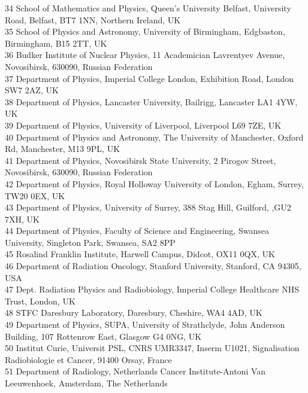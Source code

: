 {\begin{tabbing}
     34 \> School of Mathematics and Physics, Queen's University Belfast, University Road, Belfast, BT7 1NN, Northern Ireland, UK\\
     35 \> School of Physics and Astronomy, University of Birmingham, Edgbaston, Birmingham, B15 2TT, UK\\
     36 \> Budker Institute of Nuclear Physics, 11 Academician Lavrentyev Avenue, Novosibirsk, 630090, Russian Federation\\
     37 \> Department of Physics, Imperial College London, Exhibition Road, London SW7 2AZ, UK\\
     38 \> Department of Physics, Lancaster University, Bailrigg, Lancaster LA1 4YW, UK\\
     39 \> Department of Physics, University of Liverpool, Liverpool L69 7ZE, UK\\
     40 \> Department of Physics and Astronomy, The University of Manchester, Oxford Rd, Manchester, M13 9PL, UK\\
     41 \> Department of Physics, Novosibirsk State University, 2 Pirogov Street, Novosibirsk, 630090, Russian Federation\\
     42 \> Department of Physics, Royal Holloway University of London, Egham, Surrey, TW20 0EX, UK\\
     43 \> Department of Physics, University of Surrey, 388 Stag Hill, Guilford, ,GU2 7XH, UK\\
     44 \> Department of Physics, Faculty of Science and Engineering, Swansea University, Singleton Park, Swansea, SA2 8PP\\
     45 \> Rosalind Franklin Institute, Harwell Campus, Didcot, OX11 0QX, UK\\
     46 \> Department of Radiation Oncology, Stanford University, Stanford, CA 94305, USA\\
     47 \> Dept. Radiation Physics and Radiobiology, Imperial College Healthcare NHS Trust, London, UK\\
     48 \> STFC Daresbury Laboratory, Daresbury, Cheshire, WA4 4AD, UK\\
     49 \> Department of Physics, SUPA, University of Strathclyde, John Anderson Building, 107 Rottenrow East, Glasgow G4 0NG, UK\\
     50 \> Institut Curie, Universit PSL, CNRS UMR3347, Inserm U1021, Signalisation Radiobiologie et Cancer, 91400 Orsay, France\\
     51 \> Department of Radiology, Netherlands Cancer Institute-Antoni Van Leeuwenhoek, Amsterdam, The Netherlands\\
    ~   \> \\
  \end{tabbing}
}
